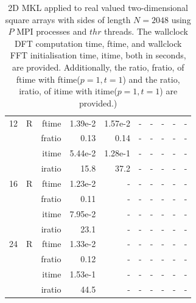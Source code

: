 \documentclass[a4paper]{article}
\begin{document}
\begin{table}[htbp]
\begin{center}
\begin{small}
\begin{tabular}{|r|r|r|r|r|r|r|r|r|r|}
  12 &   R &   ftime &    1.39e-2 &    1.57e-2 &   - &   - &   - &   - &   - \\
            &            &  fratio &    0.13 &    0.14 &   - &   - &   - &   - &   - \\
            &            &  itime &    5.44e-2 &    1.28e-1 &   - &   - &   - &   - &   - \\
            &            &  iratio &    15.8 &   37.2 &  - &   - &   - &   - &   - \\\hline
  16 &   R &   ftime &    1.23e-2 &   - &   - &   - &   - &   - &   - \\
            &            &  fratio &    0.11 &   - &   - &   - &   - &   - &   - \\
            &            &  itime &    7.95e-2 &   - &   - &   - &   - &   - &   - \\
            &            &  iratio &    23.1 &  - &   - &   - &   - &   - &   - \\\hline
  24 &   R &   ftime &    1.33e-2 &   - &   - &   - &   - &   - &   - \\
            &            &  fratio &    0.12 &   - &   - &   - &   - &   - &   - \\
            &            &  itime &    1.53e-1 &   - &   - &   - &   - &   - &   - \\
            &            &  iratio &    44.5 &  - &   - &   - &   - &   - &   - \\\hline


\end{tabular}
\caption{2D MKL applied to real valued two-dimensional square arrays with sides of length $N=2048$ using $P$ MPI processes and $thr$ threads. The wallclock DFT computation time, ftime, and wallclock FFT initialisation time, itime, both in seconds, are provided. Additionally, the ratio, fratio, of ftime  with ftime($p=1,t=1$) and the ratio, iratio, of itime  with itime($p=1,t=1$) are provided.) }\label{Tbl:MKL2d2048}
\end{small}
\end{center}
\end{table}
\end{document}
